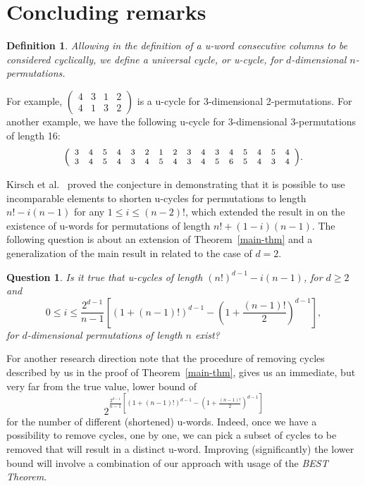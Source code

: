 \documentclass[12pt]{article}
\newtheorem{deff}[thm]{Definition}
\newtheorem{que}{Question}
\begin{document}
\section{Concluding remarks}\label{last-sec}

\begin{deff} Allowing in the definition of a u-word  consecutive columns to be considered cyclically, we define a {\em universal cycle}, or {\em u-cycle}, for $d$-dimensional $n$-permutations.
\end{deff}

For example, {\footnotesize$\left(\begin{array}{cccc} 4 & 3 & 1 & 2 \\ 4 & 1 & 3 & 2  \end{array}\right)$} is a u-cycle for 3-dimensional 2-permutations. For another example, we have the following u-cycle for 3-dimensional 3-permutations of length 16:
$$ {\footnotesize\left(\begin{array}{cccccccccccccccc} 3 & 4 & 5 & 4 & 3 & 2 & 1 & 2 & 3 & 4 & 3 & 4 & 5 & 4 & 5 & 4    \\  
 3 & 4 & 5 & 4 & 3 & 4 & 5 & 4 & 3 & 4 & 5 & 6 & 5 & 4 & 3 & 4  \end{array}\right)}.$$

Kirsch et al.~\cite{KLSS} proved the conjecture in  \cite{KPV} demonstrating that it is possible to use incomparable elements to shorten u-cycles for permutations to length $n!-i(n-1)$ for any $1\leq i\leq (n-2)!$, which extended the result in  \cite{KPV} on the existence of u-words for permutations of length  $n!+(1-i)(n-1)$. The following question is about an extension of Theorem~\ref{main-thm} and a generalization of the main result in \cite{KLSS} related to the case of $d=2$.

\begin{que} Is it true that u-cycles of length $(n!)^{d-1}-i(n-1)$, for $d\geq 2$ and $$0\leq i\leq \frac{2^{d-1}}{n-1}\left[(1+(n-1)!)^{d-1}-\left(1+\frac{(n-1)!}{2}\right)^{d-1}\right],$$ for $d$-dimensional permutations of length $n$ exist? \end{que}

For another research direction note that the procedure of removing cycles described by us in the proof of Theorem~\ref{main-thm}, gives us an immediate, but very far from the true value, lower bound of 
$$2^{\frac{2^{d-1}}{n-1}\left[(1+(n-1)!)^{d-1}-\left(1+\frac{(n-1)!}{2}\right)^{d-1}\right]}$$
for the number of different (shortened) u-words. Indeed, once we have a possibility to remove cycles, one by one, we can pick a subset of cycles to be removed that will result in a distinct u-word. Improving (significantly) the lower bound will involve a combination of our approach with usage of the {\em BEST Theorem}. 
\end{document}
